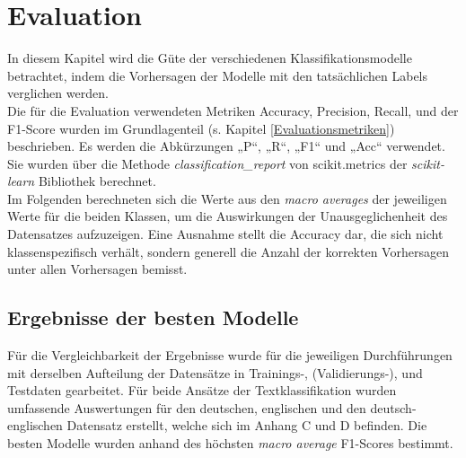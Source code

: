 \documentclass[ngerman]{ttlab-qualify}
\begin{document}
\chapter{Evaluation} \label{Evaluation}
In diesem Kapitel wird die Güte der verschiedenen Klassifikationsmodelle betrachtet, indem die Vorhersagen der Modelle mit den tatsächlichen Labels verglichen werden.\\
Die für die Evaluation verwendeten Metriken Accuracy, Precision, Recall, und der F1-Score wurden im Grundlagenteil (s. Kapitel \ref{Evaluationsmetriken}) beschrieben. Es werden die Abkürzungen „P“, „R“, „F1“ und „Acc“ verwendet. Sie wurden über die Methode \textit{classification\_report} von scikit.metrics der \textit{scikit-learn} \parencite{scikit-learn} Bibliothek berechnet.\\
Im Folgenden berechneten sich die Werte aus den \textit{macro averages} der jeweiligen Werte für die beiden Klassen, um die Auswirkungen der Unausgeglichenheit des Datensatzes aufzuzeigen. Eine Ausnahme stellt die Accuracy dar, die sich nicht klassenspezifisch verhält, sondern generell die Anzahl der korrekten Vorhersagen unter allen Vorhersagen bemisst.
\section{Ergebnisse der besten Modelle}
Für die Vergleichbarkeit der Ergebnisse wurde für die jeweiligen Durchführungen mit derselben Aufteilung der Datensätze in Trainings-, (Validierungs-), und Testdaten gearbeitet. 
Für beide Ansätze der Textklassifikation wurden umfassende Auswertungen für den deutschen, englischen und den deutsch-englischen Datensatz erstellt, welche sich im Anhang C und D befinden. Die besten Modelle wurden anhand des höchsten  \textit{macro average} F1-Scores bestimmt.
\end{document}
